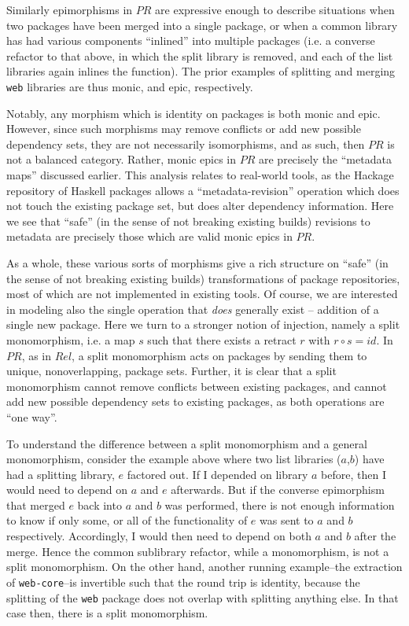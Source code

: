 \documentclass[hoptionsi,review,screen,format=sigconf]{acmart}
\theoremstyle{definition}
\newcommand{\PRb}{\mathit{PR}}
\newcommand{\Relb}{\mathit{Rel}}
\begin{document}
Similarly epimorphisms in \(\PRb\) are expressive enough to describe situations when two packages have been merged into a single package, or when a common library has had various components ``inlined'' into multiple packages (i.e. a converse refactor to that above, in which the split library is removed, and each of the list libraries again inlines the function). The prior examples of splitting and merging \texttt{web} libraries are thus monic, and epic, respectively.
   
Notably, any morphism which is identity on packages is both monic and epic. However, since such morphisms may remove conflicts or add new possible dependency sets, they are not necessarily isomorphisms, and as such, then \(\PRb\) is not a balanced category. Rather, monic epics in \(\PRb\) are precisely the ``metadata maps'' discussed earlier. This analysis relates to real-world tools, as the Hackage repository of Haskell packages allows a ``metadata-revision'' operation which does not touch the existing package set, but does alter dependency information. Here we see that ``safe'' (in the sense of not breaking existing builds) revisions to metadata  are precisely those which are valid monic epics in \(\PRb\).

As a whole, these various sorts of morphisms give a rich structure on ``safe'' (in the sense of not breaking existing builds) transformations of package repositories, most of which are not implemented in existing tools. Of course, we are interested in modeling also the single operation that \textit{does} generally exist -- addition of a single new package. Here we turn to a stronger notion of injection, namely a split monomorphism, i.e. a map \(s\) such that there exists a retract \(r\) with \(r \circ s = id\). In \(\PRb\), as in \(\Relb\), a split monomorphism acts on packages by sending them to unique, nonoverlapping, package sets. Further, it is clear that a split monomorphism cannot remove conflicts between existing packages, and cannot add new possible dependency sets to existing packages, as both operations are ``one way''. 

To understand the difference between a split monomorphism and a general monomorphism, consider the example above where two list libraries (\(a\),\(b\)) have had a splitting library, \(e\) factored out. If I depended on library \(a\) before, then I would need to depend on \(a\) and \(e\) afterwards. But if the converse epimorphism that merged \(e\) back into \(a\) and \(b\) was performed, there is not enough information to know if only some, or all of the functionality of \(e\) was sent to \(a\) and \(b\) respectively. Accordingly, I would then need to depend on both \(a\) and \(b\) after the merge. Hence the common sublibrary refactor, while a monomorphism, is not a split monomorphism. On the other hand, another running example--the extraction of \texttt{web-core}--is invertible such that the round trip is identity, because the splitting of the \texttt{web} package does not overlap with splitting anything else. In that case then, there is a split monomorphism.
\end{document}
